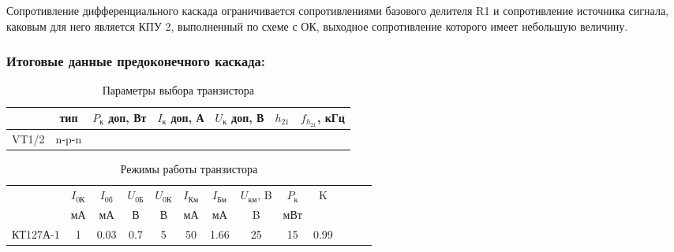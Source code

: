 \begin{equation}
\label{eq:equation4_23}

\end{equation}

Сопротивление дифференциального каскада ограничивается сопротивлениями базового делителя R1 и сопротивление источника сигнала, каковым для него является КПУ 2, выполненный по схеме с ОК, выходное сопротивление которого имеет небольшую величину.
\subsubsection{	Итоговые данные предоконечного каскада:	}

\begin{table}[htbp]
\caption{Параметры выбора транзистора}
\begin{center}\begin{tabular}{|c|c|c|c|c|c|c|}
\hline 
  & тип & $P_{\text{к}}$ доп, Вт & $I_{\text{к}}$ доп, А & $U_{\text{к}}$ доп, В & $h_{21}$ &  $f_{h_{21}}$, кГц \\ 
\hline 
VT1/2 & n-p-n &   &  &  &  & \\ 
\hline 
\end{tabular} 
\end{center}
\end{table}

\clearpage

\begin{table}[htbp]
\caption{Режимы работы транзистора}
\begin{center}\begin{tabular}{|c|c|c|c|c|c|c|c|c|c|c|c|c|}
\hline 
   & $I_\text{0К}$ & $I_\text{0б}$& $U_\text{0Б}$ & $U_\text{0К}$&  $I_{\text{Км}}$  & $I_{\text{Бм}}$& $U_{\text{км}}$, B & $P_{\text{к}}$ & K\\ 
  & мА & мА& В & В & мА & мА & B & мВт & \\
\hline 
КТ127А-1 & 1 & 0.03 & 0.7 & 5 & 50 & 1.66 & 25 & 15 & 0.99 \\
\hline
\end{tabular} 
\end{center}
\end{table}